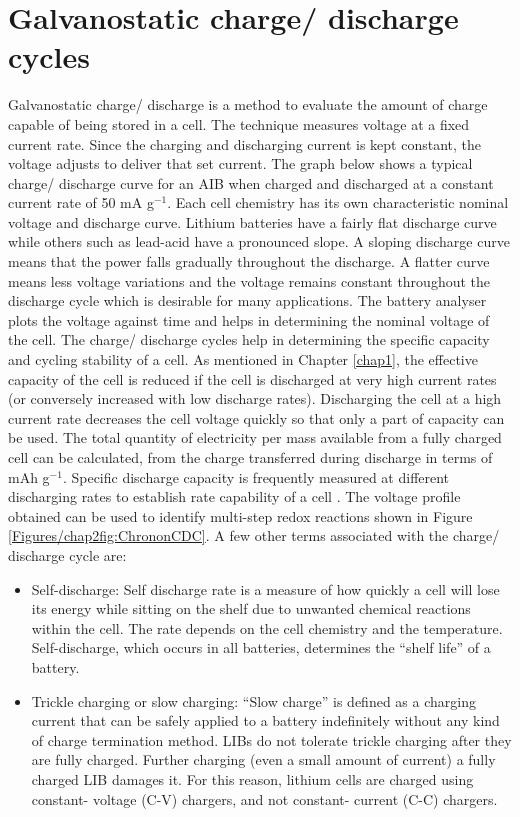 \section{Galvanostatic charge/ discharge cycles}
Galvanostatic charge/ discharge is a method to evaluate the amount of charge capable of being stored in a cell. The technique measures voltage at a fixed current rate. Since the charging and discharging current is kept constant, the voltage adjusts to deliver that set current. The graph below shows a typical charge/ discharge curve for an AIB when charged and discharged at a constant current rate of 50 mA g$^{-1}$. Each cell chemistry has its own characteristic nominal voltage and discharge curve. Lithium batteries have a fairly flat discharge curve while others such as lead-acid have a pronounced slope. A sloping discharge curve means that the power falls gradually throughout the discharge. A flatter curve means less voltage variations and the voltage remains constant throughout the discharge cycle which is desirable for many applications. The battery analyser plots the voltage against time and helps in determining the nominal voltage of the cell. The charge/ discharge cycles help in determining the specific capacity and cycling stability of a cell. As mentioned in Chapter \ref{chap1}, the effective capacity of the cell is reduced if the cell is discharged at very high current rates (or conversely increased with low discharge rates). Discharging the cell at a high current rate decreases the cell voltage quickly so that only a part of capacity can be used. The total quantity of electricity per mass available from a fully charged cell can be calculated, from the charge transferred during discharge in terms of mAh g$^{-1}$. Specific discharge capacity is frequently measured at different discharging rates to establish rate capability of a cell \cite{pyun_electrochemistry_2012-2}. The voltage profile obtained can be used to identify multi-step redox reactions shown in Figure \ref{Figures/chap2fig:ChrononCDC}. A few other terms associated with the charge/ discharge cycle are:
\begin{itemize}
\item Self-discharge: Self discharge rate is a measure of how quickly a cell will lose its energy while sitting on the shelf due to unwanted chemical reactions within the cell. The rate depends on the cell chemistry and the temperature. Self-discharge, which occurs in all batteries, determines the \enquote{shelf life} of a battery.
\item Trickle charging or slow charging: \enquote{Slow charge} is defined as a charging current that can be safely applied to a battery indefinitely without any kind of charge termination method. LIBs do not tolerate trickle charging after they are fully charged. Further charging (even a small amount of current) a fully charged LIB damages it. For this reason, lithium cells are charged using constant- voltage (C-V) chargers, and not constant- current (C-C) chargers.

\end{itemize}

